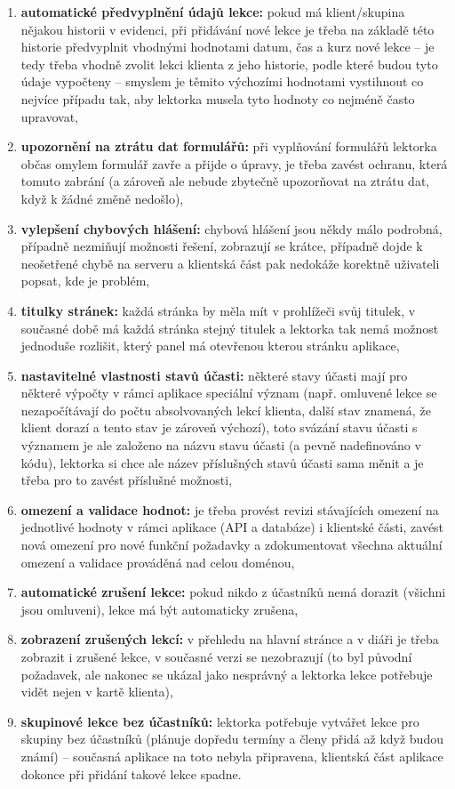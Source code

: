 \begin{enumerate}[label=\textbf{F\arabic*}]
    \item \label{F13} \textbf{automatické předvyplnění údajů lekce:} pokud má klient/skupina nějakou historii v evidenci, při přidávání nové lekce je třeba na základě této historie předvyplnit vhodnými hodnotami datum, čas a kurz nové lekce -- je tedy třeba vhodně zvolit lekci klienta z jeho historie, podle které budou tyto údaje vypočteny  -- smyslem je těmito výchozími hodnotami vystihnout co nejvíce případu tak, aby lektorka musela tyto hodnoty co nejméně často upravovat,
    \item \label{F14} \textbf{upozornění na ztrátu dat formulářů:} při vyplňování formulářů lektorka občas omylem formulář zavře a přijde o úpravy, je třeba zavést ochranu, která tomuto zabrání (a zároveň ale nebude zbytečně upozorňovat na ztrátu dat, když k žádné změně nedošlo),
    \item \label{F15} \textbf{vylepšení chybových hlášení:} chybová hlášení jsou někdy málo podrobná, případně nezmiňují možnosti řešení, zobrazují se krátce, případně dojde k neošetřené chybě na serveru a klientská část pak nedokáže korektně uživateli popsat, kde je problém,
    \item \label{F16} \textbf{titulky stránek:} každá stránka by měla mít v prohlížeči svůj titulek, v současné době má každá stránka stejný titulek a lektorka tak nemá možnost jednoduše rozlišit, který panel má otevřenou kterou stránku aplikace,
    \item \label{F17} \textbf{nastavitelné vlastnosti stavů účasti:} některé stavy účasti mají pro některé výpočty v rámci aplikace speciální význam (např. omluvené lekce se nezapočítávají do počtu absolvovaných lekcí klienta, další stav znamená, že klient dorazí a tento stav je zároveň výchozí), toto svázání stavu účasti s významem je ale založeno na názvu stavu účasti (a pevně nadefinováno v kódu), lektorka si chce ale název příslušných stavů účasti sama měnit a je třeba pro to zavést příslušné možnosti,
    \item \label{F18} \textbf{omezení a validace hodnot:} je třeba provést revizi stávajících omezení na jednotlivé hodnoty v rámci aplikace (API a databáze) i klientské části, zavést nová omezení pro nové funkční požadavky a zdokumentovat všechna aktuální omezení a validace prováděná nad celou doménou,
    \item \label{F19} \textbf{automatické zrušení lekce:} pokud nikdo z účastníků nemá dorazit (všichni jsou omluveni), lekce má být automaticky zrušena,
    \item \label{F20} \textbf{zobrazení zrušených lekcí:} v přehledu na hlavní stránce a v diáři je třeba zobrazit i zrušené lekce, v současné verzi se nezobrazují (to byl původní požadavek, ale nakonec se ukázal jako nesprávný a lektorka lekce potřebuje vidět nejen v kartě klienta),
    \item \label{F21} \textbf{skupinové lekce bez účastníků:} lektorka potřebuje vytvářet lekce pro skupiny bez účastníků (plánuje dopředu termíny a členy přidá až když budou známí) -- současná aplikace na toto nebyla připravena, klientská část aplikace dokonce při přidání takové lekce spadne.
\end{enumerate}

